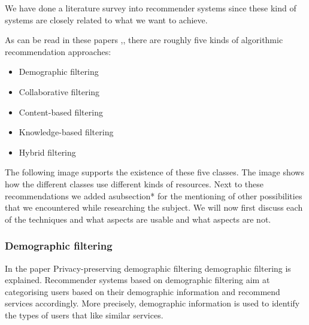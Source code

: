We have done a literature survey into recommender systems since these kind of systems are closely related to what we want to achieve.

As can be read in these papers \citep{Breese1998},\citep{Peter2007}, there are roughly five kinds of algorithmic recommendation approaches:

\begin{itemize}
\item Demographic filtering \citep{Peter2007}
\item Collaborative filtering \citep{Peter2007}\citep{Breese1998}
\item Content-based filtering \citep{Peter2007}
\item Knowledge-based filtering \citep{Peter2007}\cite{burke2000knowledge}
\item Hybrid filtering \citep{Peter2007}
\end{itemize}

The following image supports the existence of these five classes.
The image shows how the different classes use different kinds of resources.
Next to these recommendations we added asubsection* for the mentioning of other possibilities that we encountered while researching the subject.
We will now first discuss each of the techniques and what aspects are usable and what aspects are not.

\subsubsection*{Demographic filtering}
In the paper Privacy-preserving demographic filtering\cite{aimeur2006privacy} demographic filtering is explained.
Recommender systems based on demographic filtering aim at categorising users based on their demographic information and recommend services accordingly. 
More precisely, demographic information is used to identify the types of users that like similar services. 

